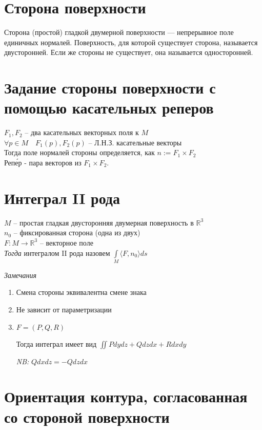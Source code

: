\documentclass[paper=a4, fontsize=17pt]{article}
\begin{document}
	\section{Сторона поверхности}
	
	Сторона (простой) гладкой двумерной поверхности {{---}} непрерывное поле единичных нормалей. Поверхность, для которой существует сторона, называется двусторонней. Если же стороны не существует, она называется односторонней.
	
	
	\section{Задание стороны поверхности с помощью касательных реперов}
	
	$F_1, F_2$ -- два касательных векторных поля к $M$\\
	$\forall p \in M \quad F_1(p), F_2(p)$ -- Л.Н.З. касательные векторы\\
	Тогда поле нормалей стороны определяется, как $n := F_1 \times F_2$\\
	
	Реп\'{е}р - пара векторов из $F_1 \times F_2$. 
	
	\section{Интеграл II рода}
	
	$M$ -- простая гладкая двусторонняя двумерная поверхность в $\mathbb{R}^3$\\
	$n_0$ -- фиксированная сторона (одна из двух)\\
	$F : M \rightarrow \mathbb{R}^3$ -- векторное поле\\
	
	\emph{Тогда} интегралом II рода назовем $\int\limits_{M} \langle F, n_0 \rangle ds$
	
	\emph{Замечания}
	\begin{enumerate}
		\item Смена стороны эквивалентна смене знака
		\item Не зависит от параметризации
		\item 
		$F=(P, Q, R)$
		
		Тогда интеграл имеет вид $\iint P dydz + Q dzdx + R dxdy$
		
		\emph{NB:} $Q dxdz = -Q dzdx$
	\end{enumerate}
	
	\section{Ориентация контура, согласованная со стороной поверхности}
	
\end{document}
